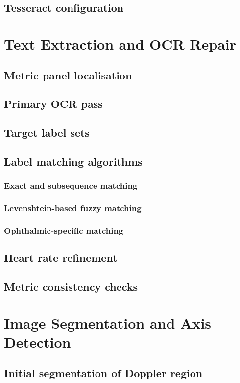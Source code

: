 \documentclass[11pt,a4paper]{article}
\begin{document}
  \subsection{Tesseract configuration}

\section{Text Extraction and OCR Repair}
  \subsection{Metric panel localisation}
  \subsection{Primary OCR pass}
  \subsection{Target label sets}
  \subsection{Label matching algorithms}
    \subsubsection{Exact and subsequence matching}
    \subsubsection{Levenshtein-based fuzzy matching}
    \subsubsection{Ophthalmic-specific matching}
  \subsection{Heart rate refinement}
  \subsection{Metric consistency checks}

\section{Image Segmentation and Axis Detection}
  \subsection{Initial segmentation of Doppler region}
\end{document}
